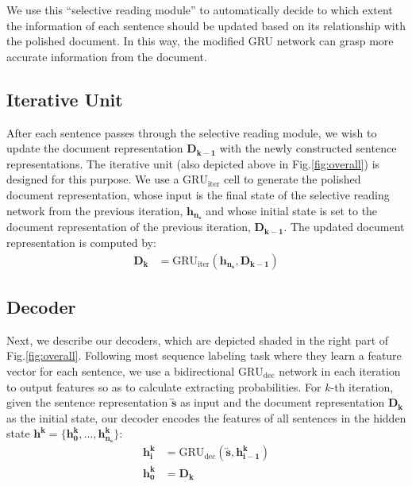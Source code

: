 \documentclass[11pt,a4paper]{article}
\begin{document}
We use this ``selective reading module'' to automatically decide to which extent the information of each sentence should be updated based on its relationship with the polished document. In this way, the modified GRU network can grasp more accurate information from the document.


\subsection{Iterative Unit}
After each sentence passes through the selective reading module, we wish to update the document representation $\bm{D_{k-1}}$ with the newly constructed sentence representations. 
The iterative unit (also depicted above in Fig.\ref{fig:overall}) is designed for this purpose.
We use a $\text{GRU}_{\text{iter}}$ cell to generate the polished document representation, whose input is the final state of the selective reading network from the previous iteration, $\bm{h_{n_{s}}}$ and whose initial state is set to the document representation of the previous iteration, $\bm{D_{k-1}}$.  The updated document representation is computed by:
\begin{align}
\bm{D_{k}}&=\text{GRU}_{\text{iter}}(\bm{h_{n_{s}}},\bm{D_{k-1}})
\end{align}

\subsection{Decoder}
Next, we describe our decoders, which are depicted shaded in the right part of Fig.\ref{fig:overall}. 
Following most sequence labeling task \cite{xue2004calibrating,Carreras:2005:ICS:1706543.1706571} where they learn a feature vector for each sentence, we use a bidirectional $\text{GRU}_{\text{dec}}$ network in each iteration to output features so as to calculate extracting probabilities.
For $k$-th iteration, given the sentence representation $\bm{\overleftrightarrow{s}}$ as input and the document representation $\bm{D_k}$ as the initial state,
our decoder encodes the features of all sentences in the hidden state $\bm{h^{k}}=\{\bm{h^{k}_{0}},...,\bm{h^{k}_{n_{s}}}\}$:
\begin{align}
\bm{h^{k}_{i}}&= \text{GRU}_{\text{dec}}(\bm{\overleftrightarrow{s}}, \bm{h^{k}_{i-1}})\\
\bm{h^{k}_{0}}&=\bm{D_k}
\end{align}
\end{document}
